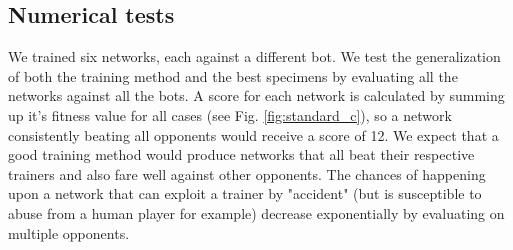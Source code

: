 \documentclass[11pt,a4paper]{scrartcl}
\begin{document}
\subsection{Numerical tests}
We trained six networks, each against a different bot. We test the generalization of both the training method and the best specimens by evaluating all the networks against all the bots. A score for each network is calculated by summing up it's fitness value for all cases (see Fig. \ref{fig:standard_c}), so a network consistently beating all opponents would receive a score of 12. We expect that a good training method would produce networks that all beat their respective trainers and also fare well against other opponents. The chances of happening upon a network that can exploit a trainer by "accident" (but is susceptible to abuse from a human player for example) decrease exponentially by evaluating on multiple opponents.
\end{document}
